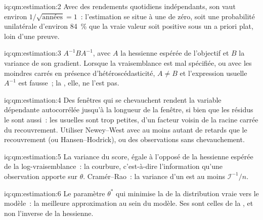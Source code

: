 \begin{solution}{iq:qm:estimation:2}
Avec des rendements quotidiens indépendants, son  vaut environ $1/\sqrt{\text{années}} = 1$~: l'estimation se situe à une  de
zéro, soit une probabilité unilatérale d'environ 84~\% que la vraie valeur soit positive sous un a priori plat, loin d'une preuve.
\end{solution}

\begin{solution}{iq:qm:estimation:3}
$A^{-1}BA^{-1}$, avec $A$ la hessienne espérée de l'objectif et $B$ la variance de son gradient. Lorsque la vraisemblance est
mal spécifiée, ou avec les moindres carrés en présence d'hétéroscédasticité, $A \ne B$ et l'expression usuelle $A^{-1}$ est fausse~; la , elle, ne l'est pas.
\end{solution}

\begin{solution}{iq:qm:estimation:4}
Des fenêtres qui se chevauchent rendent la variable dépendante autocorrélée jusqu'à la longueur de la fenêtre, si bien que les résidus le sont aussi~: les
 usuelles sont trop petites, d'un facteur voisin de la racine carrée du recouvrement. Utiliser Newey--West avec au moins autant de retards que le
recouvrement (ou Hansen--Hodrick), ou des observations sans chevauchement.
\end{solution}

\begin{solution}{iq:qm:estimation:5}
La variance du score, égale à l'opposé de la hessienne espérée de la log-vraisemblance~: la courbure, c'est-à-dire l'information
qu'une observation apporte sur $\theta$. Cramér--Rao~: la variance d'un  est au moins $\mathcal I^{-1}/n$.
\end{solution}

\begin{solution}{iq:qm:estimation:6}
Le paramètre $\theta^*$ qui minimise la  de la distribution vraie vers le modèle~: la meilleure
approximation au sein du modèle. Ses  sont celles de la , et non l'inverse de la hessienne.
\end{solution}
